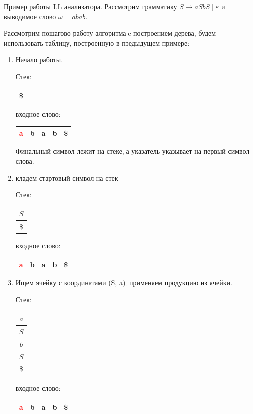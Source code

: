 \begin{example}Пример работы LL анализатора.
Рассмотрим грамматику $S \to aSbS \mid \varepsilon$ и выводимое слово $\omega = abab$.

Рассмотрим пошагово работу алгоритма c построением дерева, будем использовать таблицу, построенную в предыдущем примере:

\begin{enumerate}
  \item Начало работы.

  Стек: \,
    \begin{tabular}[c]{ |c| }
        \\ \hline
        \$ \\ \hline
    \end{tabular}
    \qquad  \qquad \qquad  \qquad входное слово: \,
    \begin{tabular}[c]{ |c|c|c|c|c| }
        \hline
        \textcolor{red}{a} & b & a & b & \$ \\ \hline
    \end{tabular}

Финальный символ лежит на стеке, а указатель указывает на первый символ слова.

  \item кладем стартовый символ на стек

    Стек: \,
    \begin{tabular}[c]{ |c| }
        \\ \hline
        $S$ \\ \hline
        \$ \\ \hline
    \end{tabular}
    \qquad  \qquad \qquad  \qquad входное слово: \,
    \begin{tabular}[c]{ |c|c|c|c|c| }
        \hline
        \textcolor{red}{a} & b & a & b & \$ \\ \hline
    \end{tabular}

  \item Ищем ячейку с координатами (S, a), применяем продукцию из ячейки.

    Стек: \,
    \begin{tabular}[c]{ |c| }
        \\ \hline
        $a$ \\ \hline
        $S$ \\ \hline
        $b$ \\ \hline
        $S$ \\ \hline
        \$ \\ \hline
    \end{tabular}
    \qquad  \qquad \qquad  \qquad входное слово: \,
    \begin{tabular}[c]{ |c|c|c|c|c| }
        \hline
        \textcolor{red}{a} & b & a & b & \$ \\ \hline
    \end{tabular}


\end{enumerate}
\end{example}
